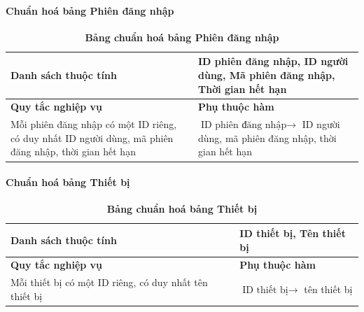 \paragraph{Chuẩn hoá bảng Phiên đăng nhập}
\mbox{}

\begin{table}[H]
  \caption{\bfseries \fontsize{12pt}{0pt}\selectfont Bảng chuẩn hoá bảng Phiên đăng nhập}
  \centering
  \begin{tabularx}{0.9\textwidth}{|X|X|}
    \hline
    \textbf{Danh sách thuộc tính} & ID phiên đăng nhập, ID người dùng, Mã phiên đăng nhập, Thời
    gian hết hạn \\ %
    \hline
    \textbf{Quy tắc nghiệp vụ} & \textbf{Phụ thuộc hàm} \\
    \hline
    Mỗi phiên đăng nhập có một ID riêng, có duy nhất ID người dùng, mã phiên đăng nhập, thời
    gian hết hạn & \parbox[t]{\linewidth}{$\text{ID phiên đăng nhập} \rightarrow$ ID người dùng, mã phiên đăng nhập, thời
    gian hết hạn} \\
    \hline
     \\
     \\
    \hline
  \end{tabularx}
\end{table}



\paragraph{Chuẩn hoá bảng Thiết bị}
\mbox{}

\begin{table}[H]
  \caption{\bfseries \fontsize{12pt}{0pt}\selectfont Bảng chuẩn hoá bảng Thiết bị}
  \centering
  \begin{tabularx}{0.9\textwidth}{|X|X|}
    \hline
    \textbf{Danh sách thuộc tính} & ID thiết bị, Tên thiết bị \\ %
    \hline
    \textbf{Quy tắc nghiệp vụ} & \textbf{Phụ thuộc hàm} \\
    \hline
    Mỗi thiết bị có một ID riêng, có duy nhất tên thiết bị & \parbox[t]{\linewidth}{$\text{ID thiết bị} \rightarrow$ tên thiết bị} \\
    \hline
     \\
     \\
    \hline
  \end{tabularx}
\end{table}




